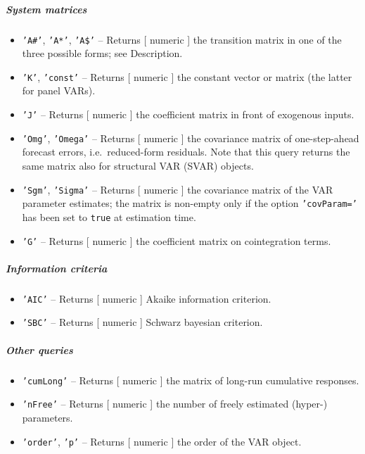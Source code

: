 \subparagraph{System matrices}\label{system-matrices}

\begin{itemize}
\item
  \texttt{'A\#'}, \texttt{'A*'}, \texttt{'A\$'} -- Returns {[} numeric
  {]} the transition matrix in one of the three possible forms; see
  Description.
\item
  \texttt{'K'}, \texttt{'const'} -- Returns {[} numeric {]} the constant
  vector or matrix (the latter for panel VARs).
\item
  \texttt{'J'} -- Returns {[} numeric {]} the coefficient matrix in
  front of exogenous inputs.
\item
  \texttt{'Omg'}, \texttt{'Omega'} -- Returns {[} numeric {]} the
  covariance matrix of one-step-ahead forecast errors, i.e.~reduced-form
  residuals. Note that this query returns the same matrix also for
  structural VAR (SVAR) objects.
\item
  \texttt{'Sgm'}, \texttt{'Sigma'} -- Returns {[} numeric {]} the
  covariance matrix of the VAR parameter estimates; the matrix is
  non-empty only if the option \texttt{'covParam='} has been set to
  \texttt{true} at estimation time.
\item
  \texttt{'G'} -- Returns {[} numeric {]} the coefficient matrix on
  cointegration terms.
\end{itemize}

\subparagraph{Information criteria}\label{information-criteria}

\begin{itemize}
\item
  \texttt{'AIC'} -- Returns {[} numeric {]} Akaike information
  criterion.
\item
  \texttt{'SBC'} -- Returns {[} numeric {]} Schwarz bayesian criterion.
\end{itemize}

\subparagraph{Other queries}\label{other-queries}

\begin{itemize}
\item
  \texttt{'cumLong'} -- Returns {[} numeric {]} the matrix of long-run
  cumulative responses.
\item
  \texttt{'nFree'} -- Returns {[} numeric {]} the number of freely
  estimated (hyper-) parameters.
\item
  \texttt{'order'}, \texttt{'p'} -- Returns {[} numeric {]} the order of
  the VAR object.
\end{itemize}


